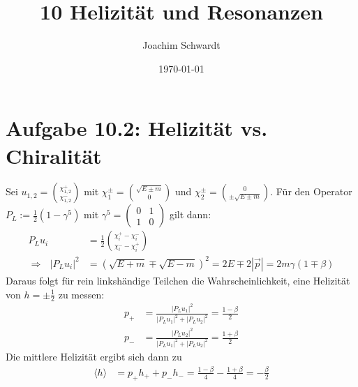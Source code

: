 \documentclass[a4paper,12pt]{article}
\newcommand{\bra}{}
\newcommand{\kla}{}
\begin{document}
\title{10 Helizität und Resonanzen}
\author{Joachim Schwardt}
\date{\today}
\maketitle

\section*{Aufgabe 10.2: Helizität vs. Chiralität}
Sei $u_{1,2}=\binom{\chi^+_{1,2}}{\chi^-_{1,2}}$ mit $\chi^\pm_1=\binom{\sqrt{E\pm m}}{0}$ und $\chi^\pm_2=\binom{0}{\pm\sqrt{E\pm m}}$. Für den Operator $P_L:=\frac{1}{2}(1-\gamma^5)$ mit $\gamma^5=\begin{pmatrix}
0&1\\ 1& 0
\end{pmatrix} $ gilt dann:
\begin{align*}
P_Lu_i&=\frac{1}{2}\binom{\chi_i^+-\chi_i^-}{\chi_i^--\chi_i^+}\\
\Rightarrow\ \ \ |P_Lu_i|^2&=\kla\left( {\sqrt{E+m}\mp\sqrt{E-m}} \right)^2=2E\mp 2|\vec{p}|=2m\gamma (1\mp\beta)
\end{align*}
Daraus folgt für rein linkshändige Teilchen die Wahrscheinlichkeit, eine Helizität von $h=\pm\frac{1}{2}$ zu messen:
\begin{align*}
p_+&=\frac{|P_Lu_1|^2}{|P_Lu_1|^2+|P_Lu_2|^2}=\frac{1-\beta}{2}\\
p_-&=\frac{|P_Lu_2|^2}{|P_Lu_1|^2+|P_Lu_2|^2}=\frac{1+\beta}{2}
\end{align*}
Die mittlere Helizität ergibt sich dann zu
\begin{align*}
\bra\langle {h}\rangle&=p_+h_++p_-h_-=\frac{1-\beta}{4}-\frac{1+\beta}{4}=-\frac{\beta}{2}
\end{align*}\,\newpage
\end{document}
